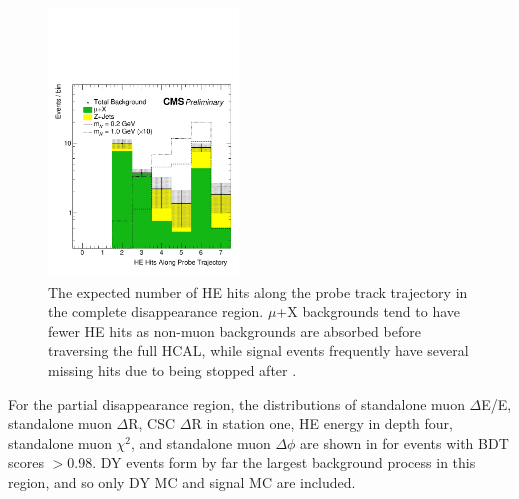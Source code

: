 \begin{figure}[htbp]
	\centering
	\includegraphics[width=0.45\textwidth]{figures/totDisappHitsOverThresh.pdf}
	\caption[Expected Complete Disappearance HE Hits]{The expected number of HE hits along the probe track trajectory in the complete disappearance region. $\mu$+X backgrounds tend to have fewer HE hits as non-muon backgrounds are absorbed before traversing the full HCAL, while signal events frequently have several missing hits due to being stopped after \dbrem.}
	\label{fig:totHitsOverThresh}
\end{figure}

For the partial disappearance region, the distributions of standalone muon $\Delta$E/E, standalone muon $\Delta$R, CSC $\Delta$R in station one, HE energy in depth four, standalone muon $\chi^{2}$, and standalone muon $\Delta\phi$ are shown in  for events with BDT scores $>$0.98.
DY events form by far the largest background process in this region, and so only DY MC and signal MC are included.


